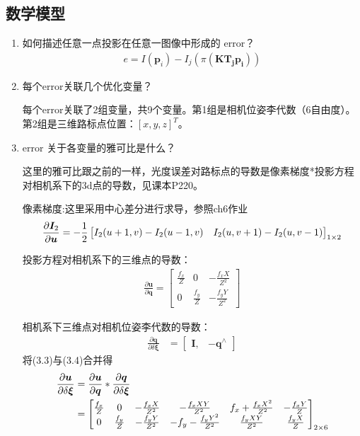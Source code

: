 \documentclass[40pt,a4paper，UTF8]{ctexart}
\numberwithin{equation}{section}
\begin{document}
\subsection{数学模型}
\begin{enumerate}
\item 如何描述任意⼀点投影在任意⼀图像中形成的 error？
\begin{align}
e = I(\bm p_i)-I_j(\pi(\bm{KT_jp_i}))
\end{align}

\item 每个error关联⼏个优化变量？

每个error关联了2组变量，共9个变量。第1组是相机位姿李代数（6自由度）。第2组是三维路标点位置：$[x,y,z]^T$。

\item error 关于各变量的雅可⽐是什么？

这里的雅可比跟之前的一样，光度误差对路标点的导数是像素梯度*投影方程对相机系下的3d点的导数，见课本P220。

像素梯度:这里采用中心差分进行求导，参照ch6作业
\begin{align}
\frac{\partial \bm I_2}{\partial \bm u}= -\frac{1}{2}
\begin{bmatrix}
I_{2}(u+1,v)-I_{2}(u-1,v) & I_{2}(u,v+1)-I_{2}(u,v-1)
\end{bmatrix}_{1\times 2} \notag \\
\end{align}

投影方程对相机系下的三维点的导数：
\begin{align}
\frac{\partial \bm u}{\partial \bm q}=
\begin{bmatrix}
\frac{f_x}{Z} & 0 & -\frac{f_xX}{Z^2} \\
0 & \frac{f_y}{Z} & -\frac{f_yY}{Z^2}
\end{bmatrix}
\end{align}

相机系下三维点对相机位姿李代数的导数：
\begin{align}
\frac{\partial \bm q}{\partial \delta \bm \xi} &=
\begin{bmatrix}
\bm I, & -\bm q^{\wedge}
\end{bmatrix}
\end{align}
将(3.3)与(3.4)合并得
\begin{align}
\frac{\partial \bm u}{\partial\delta \bm \xi}&=\frac{\partial \bm u}{\partial \bm q}*\frac{\partial \bm q}{\partial \delta \bm \xi} \notag \\
&=
\begin{bmatrix}
\frac{f_x}{Z} & 0 & -\frac{f_xX}{Z^2} & -\frac{f_xXY}{Z^2} & f_x+\frac{f_xX^2}{Z^2} & -\frac{f_xY}{Z} \\
0 & \frac{f_y}{Z} & -\frac{f_yY}{Z^2} & -f_y-\frac{f_yY^2}{Z^2} & \frac{f_yXY}{Z^2} & \frac{f_yX}{Z}
\end{bmatrix}_{2\times 6}
\end{align}


\end{enumerate}
\end{document}

